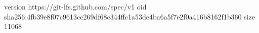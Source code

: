 version https://git-lfs.github.com/spec/v1
oid sha256:4fb39e8f07c9613cc269df68c344ffc1a53de4ba6a5f7e2f0a416b8162f1b360
size 11068
